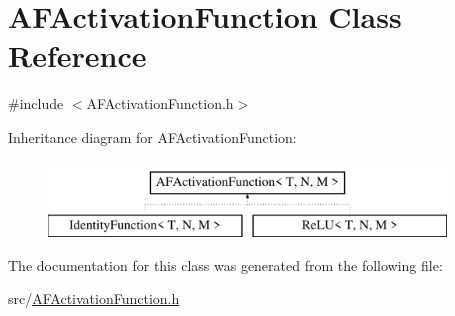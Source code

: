 \hypertarget{class_a_f_activation_function}{}\section{A\+F\+Activation\+Function Class Reference}
\label{class_a_f_activation_function}


{\ttfamily \#include $<$A\+F\+Activation\+Function.\+h$>$}

Inheritance diagram for A\+F\+Activation\+Function\+:\begin{figure}[H]
\begin{center}
\leavevmode
\includegraphics[height=2.000000cm]{class_a_f_activation_function}
\end{center}
\end{figure}


The documentation for this class was generated from the following file\+:\begin{DoxyCompactItemize}
\item 
src/\hyperlink{_a_f_activation_function_8h}{A\+F\+Activation\+Function.\+h}\end{DoxyCompactItemize}
